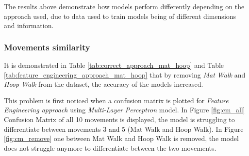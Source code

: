             The results above demonstrate how models perform differently depending on the approach used, due to data used to train models being of different dimensions and information. 

        \subsubsection{Movements similarity}   
        
            It is demonstrated in Table \ref{tab:correct_approach_mat_hoop} and Table \ref{tab:feature_engineering_approach_mat_hoop} that by removing \textit{Mat Walk} and \textit{Hoop Walk} from the dataset, the accuracy of the models increased.

            This problem is first noticed when a confusion matrix is plotted for \textit{Feature Engineering approach} using \textit{Multi-Layer Perceptron} model. In Figure \ref{fig:cm_all} Confusion Matrix of all 10 movements is displayed, the model is struggling to differentiate between movements 3 and 5 (Mat Walk and Hoop Walk). In Figure \ref{fig:cm_remove} one between Mat Walk and Hoop Walk is removed, the model does not struggle anymore to differentiate between the two movements.
            

